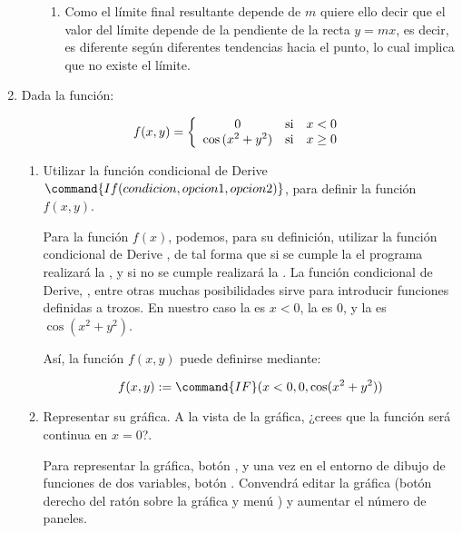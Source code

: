 \begin{enumerate}[leftmargin=*]
\begin{enumerate}
\begin{indicacion}
{\begin{enumerate}
\item Como el límite final resultante depende de $m$ quiere ello
decir que el valor del límite depende de la pendiente de la recta
$y=mx$, es decir, es diferente según diferentes tendencias hacia
el punto, lo cual implica que no existe el límite.

\end{enumerate}

}
\end{indicacion}


\end{enumerate}

\item Dada la función:

\[
f(x,y) = \left\{ {\begin{array}{*{20}c}
   0 & {\text{si}} & {x <0}  \\
   \cos{(x^2+y^2)}& {\text{si}} & {x\geq 0}  \\

 \end{array} } \right.
\]

\begin{enumerate}
  \item Utilizar la función condicional de Derive $\command{If(condicion,opcion 1,opcion 2)}$,
   para definir la función $f(x,y)$.


\begin{indicacion}
{Para la función $f(x)$, podemos, para su definición, utilizar la
función condicional de Derive , de tal forma que si se cumple la  el
programa realizará la , y si no se cumple
realizará la . La función condicional de Derive,
, entre otras muchas posibilidades sirve para introducir
funciones definidas a trozos. En nuestro caso la 
es $x<0$, la  es $0$, y la  es
$\cos(x^2+y^2)$.

Así, la función $f(x,y)$ puede definirse mediante:

\[
f(x,y):=\command{IF}(x<0,0,\cos(x^2+y^2))
\]

}
\end{indicacion}


  \item Representar su gráfica. A la vista de la gráfica, ¿crees
  que la función será continua en $x=0$?.


\begin{indicacion}
{Para representar la gráfica, botón , y una vez en
el entorno de dibujo de funciones de dos variables, botón
. Convendrá editar la gráfica (botón derecho del
ratón sobre la gráfica y menú ) y aumentar el número de
paneles. }
\end{indicacion}



\end{enumerate}
\end{enumerate}
